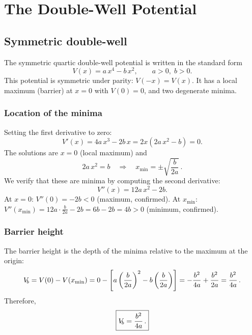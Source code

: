 \section{The Double-Well Potential}\label{sec:potential}

\subsection{Symmetric double-well}\label{sec:V_sym}

The symmetric quartic double-well potential is written in the standard form
\begin{equation}\label{eq:V_ab}
  V(x) = a\,x^4 - b\,x^2, \qquad a > 0,\; b > 0.
\end{equation}
This potential is symmetric under parity: $V(-x) = V(x)$.
It has a local maximum (barrier) at $x = 0$ with $V(0) = 0$, and two degenerate minima.

\subsubsection{Location of the minima}

Setting the first derivative to zero:
\begin{equation}
  V'(x) = 4a\,x^3 - 2b\,x = 2x(2a\,x^2 - b) = 0.
\end{equation}
The solutions are $x = 0$ (local maximum) and
\begin{equation}
  2a\,x^2 = b
  \quad\Longrightarrow\quad
  \boxed{x_{\min} = \pm\sqrt{\frac{b}{2a}}\,.}
\end{equation}
We verify that these are minima by computing the second derivative:
\begin{equation}
  V''(x) = 12a\,x^2 - 2b.
\end{equation}
At $x = 0$: $V''(0) = -2b < 0$ (maximum, confirmed).
At $x_{\min}$: $V''(x_{\min}) = 12a\cdot\frac{b}{2a} - 2b = 6b - 2b = 4b > 0$ (minimum, confirmed).

\subsubsection{Barrier height}

The barrier height is the depth of the minima relative to the maximum at the origin:
\begin{equation}
  V_{\!b} = V(0) - V(x_{\min})
  = 0 - \left[a\left(\frac{b}{2a}\right)^2 - b\left(\frac{b}{2a}\right)\right]
  = -\frac{b^2}{4a} + \frac{b^2}{2a}
  = \frac{b^2}{4a}\,.
\end{equation}
Therefore,
\begin{equation}
  \boxed{V_{\!b} = \frac{b^2}{4a}\,.}
\end{equation}

